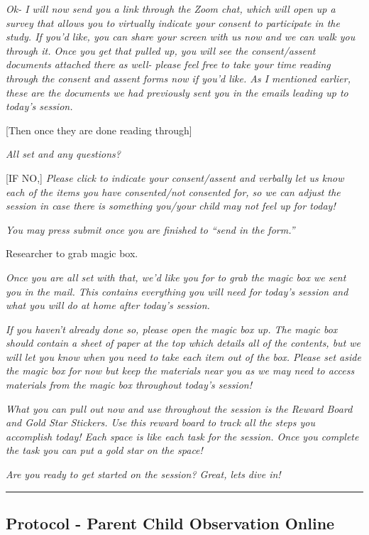 \documentclass[]{book}
\begin{document}
\emph{Ok- I will now send you a link through the Zoom chat, which will open up a survey that allows you to virtually indicate your consent to participate in the study. If you'd like, you can share your screen with us now and we can walk you through it. Once you get that pulled up, you will see the consent/assent documents attached there as well- please feel free to take your time reading through the consent and assent forms now if you'd like. As I mentioned earlier, these are the documents we had previously sent you in the emails leading up to today's session.}

{[}Then once they are done reading through{]}

\emph{All set and any questions?}

{[}IF NO,{]} \emph{Please click to indicate your consent/assent and verbally let us know each of the items you have consented/not consented for, so we can adjust the session in case there is something you/your child may not feel up for today!}

\emph{You may press submit once you are finished to ``send in the form.''}

Researcher to grab magic box.

\emph{Once you are all set with that, we'd like you for to grab the magic box we sent you in the mail. This contains everything you will need for today's session and what you will do at home after today's session.}

\emph{If you haven't already done so, please open the magic box up. The magic box should contain a sheet of paper at the top which details all of the contents, but we will let you know when you need to take each item out of the box. Please set aside the magic box for now but keep the materials near you as we may need to access materials from the magic box throughout today's session!}

\emph{What you can pull out now and use throughout the session is the Reward Board and Gold Star Stickers. Use this reward board to track all the steps you accomplish today! Each space is like each task for the session. Once you complete the task you can put a gold star on the space!}

\emph{Are you ready to get started on the session? Great, lets dive in!}

\begin{center}\rule{0.5\linewidth}{0.5pt}\end{center}

\hypertarget{protocol---parent-child-observation-online}{%
\subsection{Protocol - Parent Child Observation Online}\label{protocol---parent-child-observation-online}}
\end{document}
